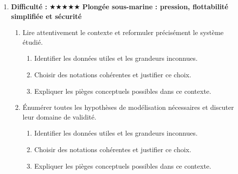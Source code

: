\documentclass[11pt,a4paper]{article}
\newcommand{\etoiles}[1]{\textbf{Difficulté : }#1}
\begin{document}
\begin{enumerate}[label=\textbf{Très long \arabic*.},leftmargin=*]
\begin{enumerate}[label=\textbf{\arabic*)}]
\item Imaginer un protocole expérimental ou numérique permettant de confronter le modèle à des mesures.
\begin{enumerate}[label=\alph*)]
\item Comparer au moins deux scénarios différents.
\item Discuter la robustesse du résultat face à une variation de paramètre.
\item Proposer une ouverture vers une situation réelle plus complexe.
\end{enumerate}
\item Rédiger une conclusion scientifique : résultats, limites, prolongements vers la Terminale ou au-delà.
\begin{enumerate}[label=\alph*)]
\item Comparer au moins deux scénarios différents.
\item Discuter la robustesse du résultat face à une variation de paramètre.
\item Proposer une ouverture vers une situation réelle plus complexe.
\end{enumerate}
\end{enumerate}
\item \etoiles{★★★★★}
\textbf{Plongée sous-marine : pression, flottabilité simplifiée et sécurité}
\begin{enumerate}[label=\textbf{\arabic*)}]
\item Lire attentivement le contexte et reformuler précisément le système étudié.
\begin{enumerate}[label=\alph*)]
\item Identifier les données utiles et les grandeurs inconnues.
\item Choisir des notations cohérentes et justifier ce choix.
\item Expliquer les pièges conceptuels possibles dans ce contexte.
\end{enumerate}
\item Énumérer toutes les hypothèses de modélisation nécessaires et discuter leur domaine de validité.
\begin{enumerate}[label=\alph*)]
\item Identifier les données utiles et les grandeurs inconnues.
\item Choisir des notations cohérentes et justifier ce choix.
\item Expliquer les pièges conceptuels possibles dans ce contexte.
\end{enumerate}

\end{enumerate}
\end{enumerate}
\end{document}
